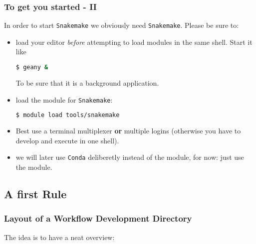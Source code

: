 \begin{frame}[fragile]
  \frametitle{To get you started - II}
  In order to start \texttt{Snakemake} we obviously need \texttt{Snakemake}. Please be sure to:
  \begin{itemize}[<+->]
   \item load your editor  \emph{before} attempting to load modules in the same shell. Start it like
         \begin{lstlisting}[language=Bash, style=Shell]
$ geany & 
         \end{lstlisting}
         To be sure that it is a background application.
   \item load the module for \texttt{Snakemake}:
         \begin{lstlisting}[language=Bash, style=Shell]
$ module load tools/snakemake
         \end{lstlisting}
   \item Best use a terminal multiplexer \textbf{or} multiple logins (otherwise you have to develop and execute in one shell).
   \item we will later use \texttt{Conda} deliberetly instead of the module, for now: just use the module.
  \end{itemize}
\end{frame}

\subsection{A first Rule}

\begin{frame}[fragile]
  \frametitle{Layout of a Workflow Development Directory} 
  \pause
  The idea is to have a neat overview:
  \begin{columns}
    \begin{column}{0.5\textwidth}
      
  \begin{minipage}[t]{0.5\textwidth}
            {\tiny \DTsetlength{0.2em}{1em}{0.2em}{0.4pt}{.6pt}
}
    \end{minipage}
    \end{column}
    \begin{column}{0.5\textwidth}
      \pause 
    \end{column}


  \end{columns}

  
\end{frame}


